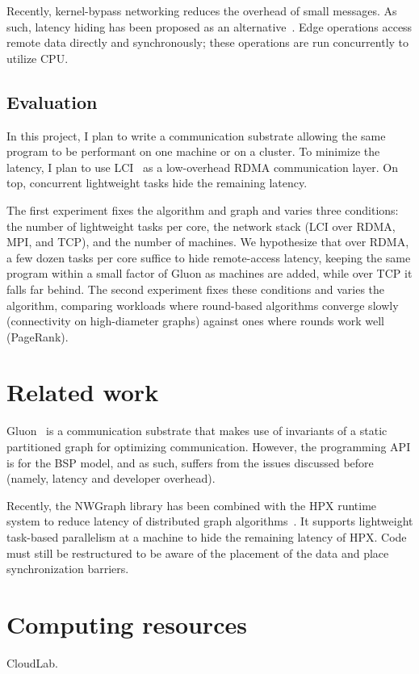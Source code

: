 \documentclass{article}
\begin{document}
Recently, kernel-bypass networking reduces the overhead of small messages.
As such, latency hiding has been proposed as an alternative~\cite{nelson2014grappa,mohammadiporshokooh2026overcoming}.
Edge operations access remote data directly and synchronously; these operations are run concurrently to utilize CPU.

\subsection{Evaluation}

In this project, I plan to write a communication substrate allowing the same program to be performant on one machine or on a cluster.
To minimize the latency, I plan to use LCI~\cite{yan2025lci} as a low-overhead RDMA communication layer.
On top, concurrent lightweight tasks hide the remaining latency.

The first experiment fixes the algorithm and graph and varies three conditions: the number of lightweight tasks per core, the network stack (LCI over RDMA, MPI, and TCP), and the number of machines.
We hypothesize that over RDMA, a few dozen tasks per core suffice to hide remote-access latency, keeping the same program within a small factor of Gluon as machines are added, while over TCP it falls far behind.
The second experiment fixes these conditions and varies the algorithm, comparing workloads where round-based algorithms converge slowly (connectivity on high-diameter graphs) against ones where rounds work well (PageRank).

\section{Related work}

Gluon~\cite{dathathri2018gluon} is a communication substrate that makes use of invariants of a static partitioned graph for optimizing communication.
However, the programming API is for the BSP model, and as such, suffers from the issues discussed before (namely, latency and developer overhead).

Recently, the NWGraph library has been combined with the HPX runtime system to reduce latency of distributed graph algorithms~\cite{mohammadiporshokooh2026overcoming}.
It supports lightweight task-based parallelism at a machine to hide the remaining latency of HPX.
Code must still be restructured to be aware of the placement of the data and place synchronization barriers.

\section{Computing resources}

CloudLab.

\printbibliography
\end{document}
